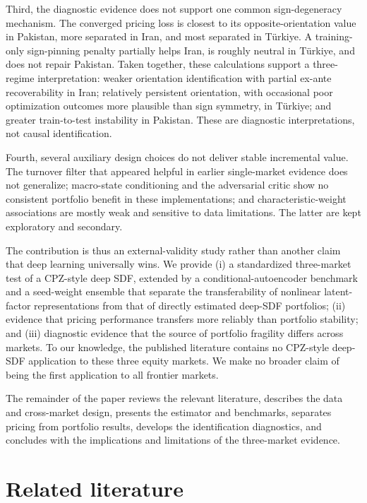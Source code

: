 \documentclass[12pt]{article}
\begin{document}
Third, the diagnostic evidence does not support one common sign-degeneracy mechanism. The converged pricing loss is closest to its opposite-orientation value in Pakistan, more separated in Iran, and most separated in T\"urkiye. A training-only sign-pinning penalty partially helps Iran, is roughly neutral in T\"urkiye, and does not repair Pakistan. Taken together, these calculations support a three-regime interpretation: weaker orientation identification with partial ex-ante recoverability in Iran; relatively persistent orientation, with occasional poor optimization outcomes more plausible than sign symmetry, in T\"urkiye; and greater train-to-test instability in Pakistan. These are diagnostic interpretations, not causal identification.

Fourth, several auxiliary design choices do not deliver stable incremental value. The turnover filter that appeared helpful in earlier single-market evidence does not generalize; macro-state conditioning and the adversarial critic show no consistent portfolio benefit in these implementations; and characteristic-weight associations are mostly weak and sensitive to data limitations. The latter are kept exploratory and secondary.

The contribution is thus an external-validity study rather than another claim that deep learning universally wins. We provide (i) a standardized three-market test of a CPZ-style deep SDF, extended by a conditional-autoencoder benchmark and a seed-weight ensemble that separate the transferability of nonlinear latent-factor representations from that of directly estimated deep-SDF portfolios; (ii) evidence that pricing performance transfers more reliably than portfolio stability; and (iii) diagnostic evidence that the source of portfolio fragility differs across markets. To our knowledge, the published literature contains no CPZ-style deep-SDF application to these three equity markets. We make no broader claim of being the first application to all frontier markets.

The remainder of the paper reviews the relevant literature, describes the data and cross-market design, presents the estimator and benchmarks, separates pricing from portfolio results, develops the identification diagnostics, and concludes with the implications and limitations of the three-market evidence.

\section{Related literature}\label{sec:lit}
\end{document}
